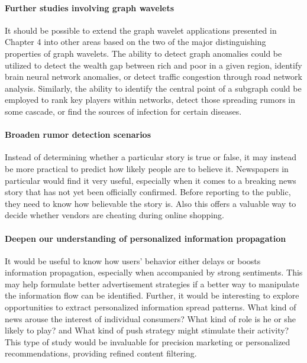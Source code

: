\paragraph{Further studies involving graph wavelets}
It should be possible to extend the graph wavelet applications presented in Chapter 4 into other areas based on the two of the major distinguishing properties of graph wavelets. The ability to detect graph anomalies could be utilized to detect the wealth gap between rich and poor in a given region, identify brain neural network anomalies, or detect traffic congestion through road network analysis. Similarly, the ability to identify the central point of a subgraph could be employed to rank key players within networks, detect those spreading rumors in some cascade, or find the sources of infection for certain diseases.

\paragraph{Broaden rumor detection scenarios}
Instead of determining whether a particular story is true or false, it may instead be more practical to predict how likely people are to believe it. Newspapers in particular would find it very useful, especially when it comes to a breaking news story that has not yet been officially confirmed. Before reporting to the public, they need to know how believable the story is. Also this offers a valuable way to decide whether vendors are cheating during online shopping.


\paragraph{Deepen our understanding of personalized information propagation}
It would be useful to know how users' behavior either delays or boosts information propagation, especially when accompanied by strong sentiments. This may help formulate better advertisement strategies if a better way to manipulate the information flow can be identified. Further, it would be interesting to explore opportunities to extract personalized information spread patterns. What kind of news arouse the interest of individual consumers? What kind of role is he or she likely to play? and What kind of push strategy might stimulate their activity? This type of study would be invaluable for precision marketing or personalized recommendations, providing refined content filtering.


